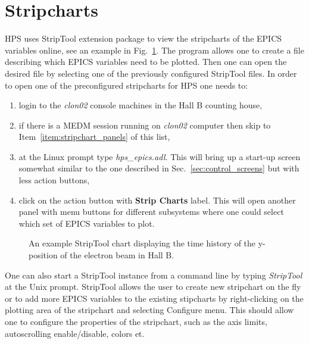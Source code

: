 \documentclass[letter,10pt]{article}
\begin{document}
\section{Stripcharts}
HPS uses StripTool extension package to view the stripcharts of the EPICS variables online, see an example 
in Fig.~\ref{fig:strip_chart}. 
The program allows one to create a file describing which EPICS variables need to be plotted. Then one 
can open the desired file by selecting one of the previously configured StripTool files.
In order to open one of the preconfigured stripcharts for HPS one needs to:
\begin{enumerate}
 \item login to the \textit{clon02} console machines in the Hall B counting house,
 \item if there is a MEDM session running on \textit{clon02} computer then skip to Item~\ref{item:stripchart_panels} of this list,
 \item at the Linux prompt type \textit{hps\_epics.adl}. This will bring up a start-up screen somewhat 
       similar to the one described in Sec.~\ref{sec:control_screens} but with less action buttons, 
 \item \label{item:stripchart_panels} click on the action button with \textbf{Strip Charts} label. This will 
        open another panel with menu buttons for different subsystems where one could select which set of EPICS 
        variables to plot. 
\end{enumerate}

 \begin{figure}
  \centering
  \caption{An example StripTool chart displaying the time history of the y-position of the electron beam in Hall B.} 
  \label{fig:strip_chart}
 \end{figure}

One can also start a StripTool instance from a command line by typing \textit{StripTool} at the Unix prompt. 
StripTool allows the user to create new stripchart on the fly or to add more EPICS 
variables to the existing stipcharts by right-clicking on the plotting area of the stripchart and selecting 
Configure menu. This should allow one to configure the properties of the stripchart, such as the axis limits, 
autoscrolling enable/disable, colors et.
\end{document}
